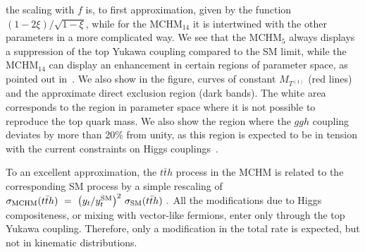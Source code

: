 the scaling with $f$ is, to first approximation, given by the function
$(1-2\xi)/\sqrt{1-\xi}$, while for the MCHM$_{14}$ it is
intertwined with the other parameters in a more complicated way.  We
see that the MCHM$_5$ always displays a suppression of the top Yukawa
coupling compared to the SM limit, while the MCHM$_{14}$ can display
an enhancement in certain regions of parameter space, as pointed out
in~\cite{Liu:2017dsz}.  We also show in the figure, curves of constant
$M_{T^{(1)}}$ (red lines) and the approximate direct exclusion region
(dark bands).  The white area corresponds to the region in parameter
space where it is not possible to reproduce the top quark mass.  We
also show the region where the $ggh$ coupling deviates by more than
20\% from unity, as this region is expected to be in tension with the
current constraints on Higgs couplings~\cite{Khachatryan:2016vau}.

\label{tth}
To an excellent approximation, the $t\bar{t} h$ process in the MCHM
is related to the corresponding SM process by a simple rescaling of $\sigma_{\rm MCHM}(t\bar{t}h) ~=~ \left( y_t/y_t^{\rm SM} \right)^2 \, \sigma_{\rm SM}(t\bar{t}h)~.
\label{sigmatth}$
All the modifications due to Higgs compositeness, or mixing with
vector-like fermions, enter only through the top Yukawa coupling.
Therefore, only a modification in the total rate is expected, but not in kinematic distributions.
%
%

